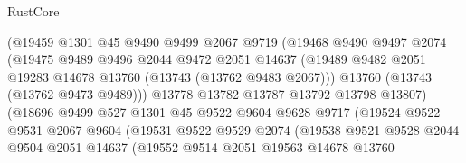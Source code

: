 \begin{lexlean}{RustCore}
\begin{coremodule}
                            (@19459
                              @1301
                              @45
                              @9490
                              @9499
                              @2067
                              @9719
                              (@19468
                                @9490
                                @9497
                                @2074
                                (@19475
                                  @9489
                                  @9496
                                  @2044
                                  @9472
                                  @2051
                                  @14637
                                  (@19489
                                    @9482
                                    @2051
                                    @19283
                                    @14678
                                    @13760
                                    (@13743 (@13762 @9483 @2067)))
                                  @13760
                                  (@13743 (@13762 @9473 @9489)))
                                @13778
                                @13782
                                @13787
                                @13792
                                @13798
                                @13807)
                              (@18696
                                @9499
                                @527
                                @1301
                                @45
                                @9522
                                @9604
                                @9628
                                @9717
                                (@19524
                                  @9522
                                  @9531
                                  @2067
                                  @9604
                                  (@19531
                                    @9522
                                    @9529
                                    @2074
                                    (@19538
                                      @9521
                                      @9528
                                      @2044
                                      @9504
                                      @2051
                                      @14637
                                      (@19552
                                        @9514
                                        @2051
                                        @19563
                                        @14678
                                        @13760

\end{coremodule}
\end{lexlean}
